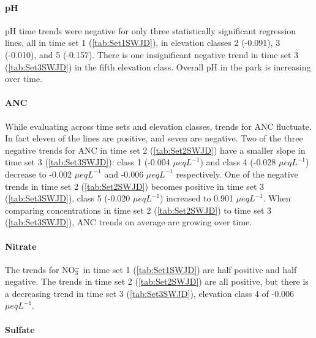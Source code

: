 





\paragraph{pH}

pH time trends were negative for only three statistically significant regression lines, all in time set 1 (\autoref{tab:Set1SWJD}), in elevation classes 2 (-0.091), 3 (-0.010), and 5 (-0.157).   
There is one insignificant negative trend in time set 3 (\autoref{tab:Set3SWJD}) in the fifth elevation class.   
Overall pH in the park is increasing over time.

\paragraph{ANC}

While evaluating across time sets and elevation classes, trends for ANC fluctuate.
In fact eleven of the lines are positive, and seven are negative.   
Two of the three negative trends for ANC in time set 2 (\autoref{tab:Set2SWJD}) have a smaller slope in time set 3 (\autoref{tab:Set3SWJD}): class 1 (-0.004 $\mu eq L^{-1}$) and class 4 (-0.028 $\mu eq L^{-1}$) decrease to -0.002 $\mu eq L^{-1}$ and -0.006 $\mu eq L^{-1}$ respectively.
One of the negative trends in time set 2 (\autoref{tab:Set2SWJD}) becomes positive in time set 3 (\autoref{tab:Set3SWJD}), class 5 (-0.020 $\mu eq L^{-1}$) increased to 0.901 $\mu eq L^{-1}$.
When comparing concentrations in time set 2 (\autoref{tab:Set2SWJD}) to time set 3 (\autoref{tab:Set3SWJD}), ANC trends on average are growing over time. 

\paragraph{Nitrate}

The trends for NO$_3^-$ in time set 1 (\autoref{tab:Set1SWJD}) are half positive and half negative.
The trends in time set 2 (\autoref{tab:Set2SWJD}) are all positive, but there is a decreasing trend in time set 3 (\autoref{tab:Set3SWJD}), elevation class 4 of -0.006 $\mu eq L^{-1}$. 

\paragraph{Sulfate}


